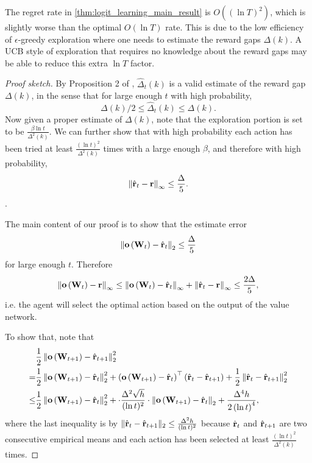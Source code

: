 \begin{remk}
	The regret rate in \cref{thm:logit_learning_main_result} is $O((\ln T)^2)$, which is slightly worse than the optimal $O(\ln T)$ rate. 
	This is due to the low efficiency of $\epsilon$-greedy exploration where one needs to estimate the reward gaps $\Delta(k)$. 
	A UCB style of exploration that requires no knowledge about the reward gaps may be able to reduce this extra $\ln T$ factor.
\end{remk}
\begin{proof} [Proof sketch]
		By Proposition 2 of \citep{seldin2017improved}, $\hat{\Delta}_t(k)$ is a valid estimate of the reward gap $\Delta(k)$, in the sense that for large enough $t$ with high probability, 
		\[
		\Delta(k)/2 \le \hat{\Delta}_t(k) \le 	\Delta(k).
		\]
		Now given a proper estimate of $\Delta(k)$, note that the exploration portion is set to be $\frac{\beta\ln t}{\Delta^2(k)}$.
		We can further show that with high probability each action has been tried at least $\frac{(\ln t)^2}{\Delta^2(k)}$ times with a large enough $\beta$, and therefore with high probability, 
		\[
		\left\| \hat{{\mathbf{r}}}_t - {\mathbf{r}} \right\|_\infty \le \frac{\Delta}{5}.
		\]
	. 
	
		The main content of our proof is to show that the estimate error 
		\[
		\left\| {\mathbf{o}}\left( {\mathbf{W}}_{t} \right) - \hat{{\mathbf{r}}}_{t}\right\|_2 \le \frac{\Delta}{5}
		\]
		for large enough $t$. Therefore 
		\[
			\left\| {\mathbf{o}}\left( {\mathbf{W}}_t \right) - {\mathbf{r}} \right\|_\infty \le \left\| {\mathbf{o}}\left( {\mathbf{W}}_t \right) - \hat{{\mathbf{r}}}_t\right\|_\infty + \left\| \hat{{\mathbf{r}}}_t - {\mathbf{r}}\right\|_\infty \le \frac{2\Delta}{5},
		\] 
		i.e. the agent will select the optimal action based on the output of the value network.
		
		To show that, note that 
		\begin{equation*}
		\begin{split}
		& \frac{1}{2} \left\| {\mathbf{o}}\left( {\mathbf{W}}_{t+1} \right) - \hat{{\mathbf{r}}}_{t+1}\right\|_2^2 \\
		= & \frac{1}{2} \left\| {\mathbf{o}}\left( {\mathbf{W}}_{t+1} \right) - \hat{{\mathbf{r}}}_t\right\|_2^2 + \left( {\mathbf{o}}\left( {\mathbf{W}}_{t+1} \right) - \hat{{\mathbf{r}}}_t \right)^\top \left( \hat{{\mathbf{r}}}_t - \hat{{\mathbf{r}}}_{t+1} \right) + \frac{1}{2} \left\| \hat{{\mathbf{r}}}_t - \hat{{\mathbf{r}}}_{t+1} \right\|_2^2		\\
		 \le &  \frac{1}{2} \left\| {\mathbf{o}}\left( {\mathbf{W}}_{t+1} \right) - \hat{{\mathbf{r}}}_t\right\|_2^2  + \cdot \frac{\Delta^2 \sqrt{h}}{(\ln{t})^2} \cdot \left\| {\mathbf{o}}\left( {\mathbf{W}}_{t+1} \right) - \hat{{\mathbf{r}}}_t\right\|_2 + \frac{\Delta^4 h}{2 \left( \ln{t} \right)^4 },
		\end{split}
		\end{equation*}
		where the last inequality is by $\| \hat{{\mathbf{r}}}_t - \hat{{\mathbf{r}}}_{t+1} \|_2 \le \frac{\Delta^2 h}{(\ln t)^2}$ because $\hat{{\mathbf{r}}}_t$  and $\hat{{\mathbf{r}}}_{t+1}$ are two consecutive empirical means and each action has been selected at least $\frac{(\ln t)^2}{\Delta^2(k)}$ times. 
		

\end{proof}
